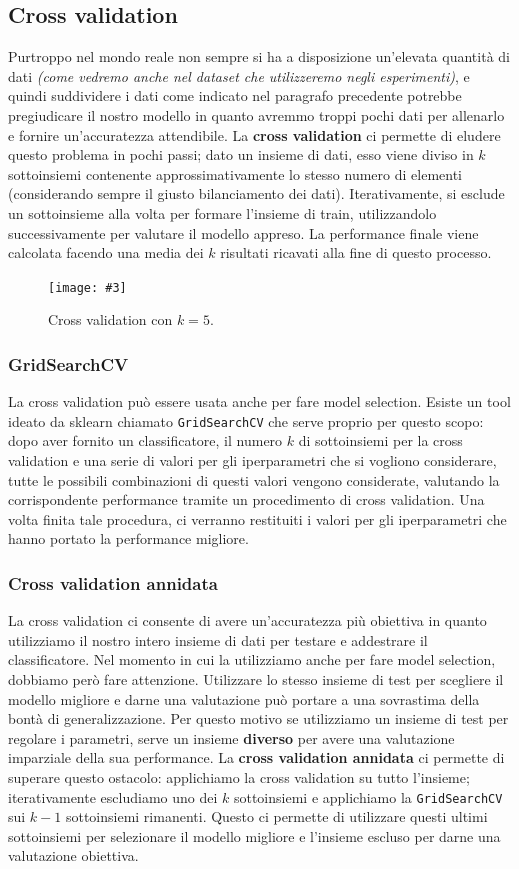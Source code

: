 \documentclass[12pt, twoside, letterpaper]{report}
\newcommand{\img}[4] {
	\begin{figure}
		\centering
		\texttt{[image: \#3]}\\
		\caption{#1}
		\label{fig:#4}
	\end{figure}
}
\begin{document}
			\subsection{Cross validation}
				Purtroppo nel mondo reale non sempre si ha a disposizione un'elevata quantità di dati \textit{(come vedremo anche nel dataset che utilizzeremo negli esperimenti)}, e quindi suddividere i dati come indicato nel paragrafo precedente potrebbe pregiudicare il nostro modello in quanto avremmo troppi pochi dati per allenarlo e fornire un'accuratezza attendibile. La \textbf{cross validation} ci permette di eludere questo problema in pochi passi; dato un insieme di dati, esso viene diviso in $k$ sottoinsiemi contenente approssimativamente lo stesso numero di elementi (considerando sempre il giusto bilanciamento dei dati). Iterativamente, si esclude un sottoinsieme alla volta per formare l'insieme di train, utilizzandolo successivamente per valutare il modello appreso. La performance finale viene calcolata facendo una media dei $k$ risultati ricavati alla fine di questo processo. 
				\img{Cross validation con $k = 5$.}{0.5}{cv.png}{cv}
				
				\subsubsection{GridSearchCV}
					La cross validation può essere usata anche per fare model selection. Esiste un tool ideato da sklearn \cite{sklearn} chiamato \texttt{GridSearchCV} che serve proprio per questo scopo: dopo aver fornito un classificatore, il numero $k$ di sottoinsiemi per la cross validation e una serie di valori per gli iperparametri che si vogliono considerare, tutte le possibili combinazioni di questi valori vengono considerate, valutando la corrispondente performance tramite un procedimento di cross validation. Una volta finita tale procedura, ci verranno restituiti i valori per gli iperparametri che hanno portato la performance migliore.
				
				\subsubsection{Cross validation annidata}	
					La cross validation ci consente di avere un'accuratezza più obiettiva in quanto utilizziamo il nostro intero insieme di dati per testare e addestrare il classificatore. Nel momento in cui la utilizziamo anche per fare model selection, dobbiamo però fare attenzione. Utilizzare lo stesso insieme di test per scegliere il modello migliore e darne una valutazione può portare a una sovrastima della bontà di generalizzazione. Per questo motivo se utilizziamo un insieme di test per regolare i parametri, serve un insieme \textbf{diverso} per avere una valutazione imparziale della sua performance. La \textbf{cross validation annidata} ci permette di superare questo ostacolo: applichiamo la cross validation su tutto l'insieme; iterativamente escludiamo uno dei $k$ sottoinsiemi e applichiamo la \texttt{GridSearchCV} sui $k-1$ sottoinsiemi rimanenti. Questo ci permette di utilizzare questi ultimi sottoinsiemi per selezionare il modello migliore e l'insieme escluso per darne una valutazione obiettiva.
				
\end{document}
